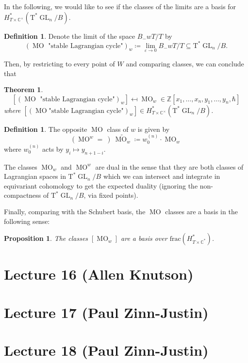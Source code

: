 \documentclass[12pt]{amsart}
\numberwithin{equation}{section}
\newtheorem{Theorem}[equation]{Theorem}
\newtheorem{Proposition}[equation]{Proposition}
\theoremstyle{definition}
\newtheorem{Definition}[equation]{Definition}
\numberwithin{figure}{section}
\newcommand{\C}{\mathbb{C}}
\newcommand{\GL}{\operatorname{GL}}
\newcommand{\MO}{\operatorname{MO}}
\begin{document}
In the following, we would like to see if the classes of the limits are a basis for $H^*_{T \times \C^\times}(\text{T}^* \GL_n/B)$.

\begin{Definition}
	Denote the limit of the space $B_-w T/T$ by
	\[
		(\MO \text{ "stable Lagrangian cycle"})_w \coloneqq \lim_{\varepsilon\to 0} B_-w T/T \subseteq \text{T}^* \GL_n/B.
	\]
\end{Definition}

Then, by restricting to every point of $W$ and comparing classes, we can conclude that

\begin{Theorem}
	\[
		[ (\MO \text{ "stable Lagrangian cycle"})_w ]  \mapsfrom \MO_w \in \mathbb{Z}[x_1,\dots,x_n, y_1, \dots, y_n, \hbar]
	\]
	where $[ (\MO \text{"stable Lagrangian cycle"})_w ] \in H^*_{T \times \C^\times}(\text{T}^* \GL_n/B)$.
\end{Theorem}

\begin{Definition}
	The opposite $\MO$ class of $w$ is given by
	\[
		(\MO^w =\ )\  \widetilde{\MO_w} \coloneqq w_0^{(n)} \cdot \MO_w
	\]
	where $w_0^{(n)}$ acts by $y_i \mapsto y_{n+1-i}$.
\end{Definition}

The classes $\MO_w$ and $\MO^w$ are dual in the sense that they are both classes of Lagrangian spaces in $\text{T}^* \GL_n/B$ which we can intersect and integrate in equivariant cohomology to get the expected duality (ignoring the non-compactness of $\text{T}^* \GL_n/B$, via fixed points).

Finally, comparing with the Schubert basis, the $\MO$ classes are a basis in the following sense:
\begin{Proposition}
	The classes $[\MO_w]$ are a basis over $\text{frac}(H^*_{T\times\C^*})$.
\end{Proposition}

\section{Lecture 16 (Allen Knutson)}

\section{Lecture 17 (Paul Zinn-Justin)}

\section{Lecture 18 (Paul Zinn-Justin)}
\end{document}
